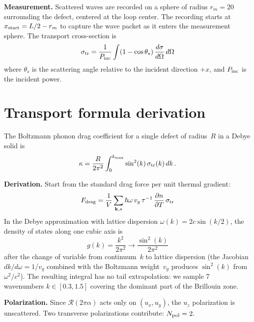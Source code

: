 \documentclass[11pt]{article}
\begin{document}
\textbf{Measurement.}
Scattered waves are recorded on a sphere of radius $r_m = 20$ surrounding the
defect, centered at the loop center. The recording starts at
$x_{\rm start} = L/2 - r_m$ to capture the wave packet as it enters the
measurement sphere. The transport cross-section is
%
\begin{equation}
\sigma_{\rm tr} = \frac{1}{P_{\rm inc}}
  \int (1 - \cos\theta_s)\,\frac{d\sigma}{d\Omega}\,d\Omega
\end{equation}
%
where $\theta_s$ is the scattering angle relative to the incident direction
$+x$, and $P_{\rm inc}$ is the incident power.

\section{Transport formula derivation}
\label{sec:transport}

The Boltzmann phonon drag coefficient for a single defect of radius~$R$ in a
Debye solid is
%
\begin{equation}
\kappa = \frac{R}{2\pi^2} \int_0^{k_{\rm max}}
  \sin^2(k)\,\sigma_{\rm tr}(k)\,dk \,.
\end{equation}

\textbf{Derivation.}
Start from the standard drag force per unit thermal gradient:
%
\begin{equation}
F_{\rm drag} = \frac{1}{V} \sum_{\mathbf{k},s}
  \hbar\omega\,v_g\,\tau^{-1}\,\frac{\partial n}{\partial T}\,\sigma_{\rm tr}
\end{equation}
%
In the Debye approximation with lattice dispersion
$\omega(k) = 2c\sin(k/2)$, the density of states along one cubic axis is
%
\begin{equation}
g(k) = \frac{k^2}{2\pi^2} \to \frac{\sin^2(k)}{2\pi^2}
\end{equation}
%
after the change of variable from continuum~$k$ to lattice dispersion (the
Jacobian $dk/d\omega = 1/v_g$ combined with the Boltzmann weight~$v_g$
produces $\sin^2(k)$ from $\omega^2/c^2$). The resulting integral has no tail
extrapolation: we sample 7 wavenumbers $k \in [0.3, 1.5]$ covering the
dominant part of the Brillouin zone.

\textbf{Polarization.}
Since $\mathcal{R}(2\pi\alpha)$ acts only on $(u_x, u_y)$, the $u_z$
polarization is unscattered. Two transverse polarizations contribute:
$N_{\rm pol} = 2$.

\end{document}
